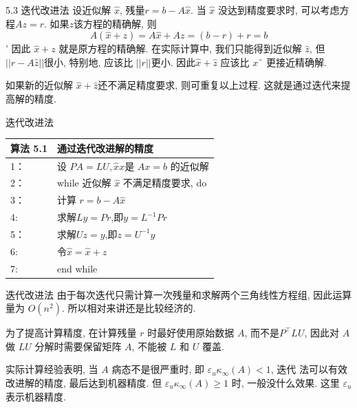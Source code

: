 \documentclass[notheorems,serif]{beamer}
\begin{document}
\begin{frame}{5.3 \quad 迭代改进法}
设近似解 $\hat{x}$, 残量$ r = b − A\hat{x}$. 当 $\hat{x}$ 没达到精度要求时, 可以考虑方程$Az = r$. 如果$ z $该方程的精确解, 则
\begin{equation}
A(\hat{x}+z)=A \hat{x}+A z=(b-r)+r=b
\end{equation}'
因此 $\hat{x} + z$ 就是原方程的精确解. 在实际计算中, 我们只能得到近似解 $\hat{z}$,
但 $||r-A\hat{z}||$很小, 特别地, 应该比 $||r||$更小. 因此$ \hat{x} + \hat{z}$ 应该比 $xˆ$ 更接近精确解.

如果新的近似解 $\hat{x} + \hat{z} $还不满足精度要求, 则可重复以上过程.
这就是通过迭代来提高解的精度.
\end{frame}

\begin{frame}{迭代改进法}
\begin{table}  
	\begin{tabular*}{16cm}{ll}  
		\hline  
		算法 5.1 &通过迭代改进解的精度\\  
		\hline  
		1：   & 设 $P A = LU, \hat{x}x$是 $Ax = b$ 的近似解\\  
		2：   & while 近似解 $\hat{x}$ 不满足精度要求, do\\
		3：   & \qquad 计算 $r = b -A \hat{x}$ \\
		4:    & \qquad 求解$Ly=Pr$,即$y=L^{-1}Pr$\\
		5：    & \qquad 求解$Uz=y$,即$z=U^{-1}y$\\
		6:    & \qquad 令$\hat{x}=\hat{x}+z$\\
		7:    &end while\\
		\hline  
	\end{tabular*}  
\end{table}
\end{frame}

\begin{frame}{迭代改进法}
由于每次迭代只需计算一次残量和求解两个三角线性方程组, 因此运算
量为 $O(n^2)$. 所以相对来讲还是比较经济的.

{\red{$\dagger$}}为了提高计算精度, 在计算残量 $r$ 时最好使用原始数据 $A$, 而不是$P^{\top}LU$, 因此对 $A$ 做 $LU$ 分解时需要保留矩阵 $A$, 不能被 $L$ 和 $U$ 覆盖.

{\red{$\dagger$}}实际计算经验表明, 当 $A$ 病态不是很严重时, 即 $ε_uκ_∞(A) < 1$, 迭代
法可以有效改进解的精度, 最后达到机器精度. 但 $ε_uκ_∞(A) ≥ 1$ 时,
一般没什么效果. 这里 $ε_u$ 表示机器精度.
\end{frame}
\end{document}
